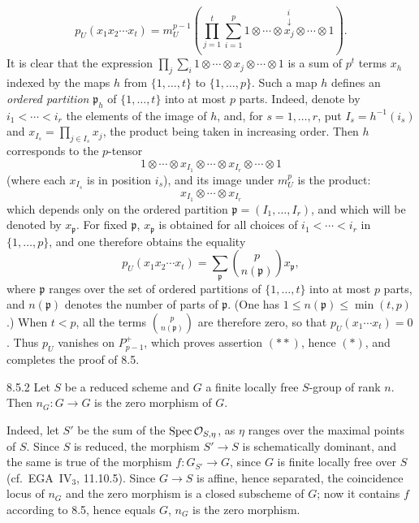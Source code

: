 \[
p_U(x_1x_2\cdots x_t)=m_U^{p-1}\left(\prod_{j=1}^t\sum_{i=1}^p1\otimes\cdots\otimes\overset{\substack{i\\\downarrow}}{x_j}\otimes\cdots\otimes1\right).
\]
It is clear that the expression $\prod_j\sum_i1\otimes\cdots\otimes x_j\otimes\cdots\otimes1$ is a sum of $p^t$ terms $x_h$ indexed by the maps $h$ from $\{1,\ldots,t\}$ to $\{1,\ldots,p\}$. Such a map $h$ defines an \emph{ordered partition} $\mathfrak p_h$ of $\{1,\ldots,t\}$ into at most $p$ parts. Indeed, denote by $i_1<\cdots<i_r$ the elements of the image of $h$, and, for $s=1,\ldots,r$, put $I_s=h^{-1}(i_s)$ and $x_{I_s}=\prod_{j\in I_s}x_j$, the product being taken in increasing order. Then $h$ corresponds to the $p$-tensor
\[
1\otimes\cdots\otimes x_{I_1}\otimes\cdots\otimes x_{I_r}\otimes\cdots\otimes1
\]
(where each $x_{I_s}$ is in position $i_s$), and its image under $m_U^p$ is the product:
\[
x_{I_1}\otimes\cdots\otimes x_{I_r}
\]
which depends only on the ordered partition $\mathfrak p=(I_1,\ldots,I_r)$, and which will be denoted by $x_{\mathfrak p}$. For fixed $\mathfrak p$, $x_{\mathfrak p}$ is obtained for all choices of $i_1<\cdots<i_r$ in $\{1,\ldots,p\}$, and one therefore obtains the equality
\[
p_U(x_1x_2\cdots x_t)=\sum_{\mathfrak p}\binom p{n(\mathfrak p)}x_{\mathfrak p},
\]
where $\mathfrak p$ ranges over the set of ordered partitions of $\{1,\ldots,t\}$ into at most $p$ parts, and $n(\mathfrak p)$ denotes the number of parts of $\mathfrak p$. (One has $1\leq n(\mathfrak p)\leq\min(t,p)$.)
When $t<p$, all the terms $\binom p{n(\mathfrak p)}$ are therefore zero, so that $p_U(x_1\cdots x_t)=0$. Thus $p_U$ vanishes on $P_{p-1}^+$, which proves assertion $(**)$, hence $(*)$, and completes the proof of 8.5.

\begin{corollary}{8.5.2}\label{VIIA.8.5.2}
Let $S$ be a reduced scheme and $G$ a finite locally free $S$-group of rank $n$. Then $n_G:G\to G$ is the zero morphism of $G$.
\end{corollary}
Indeed, let $S'$ be the sum of the $\operatorname{Spec}\mathcal{O}_{S,\eta}$, as $\eta$ ranges over the maximal points of $S$. Since $S$ is reduced, the morphism $S'\to S$ is schematically dominant, and the same is true of the morphism $f:G_{S'}\to G$, since $G$ is finite locally free over $S$ (cf.\ EGA~IV$_3$, 11.10.5). Since $G\to S$ is affine, hence separated, the coincidence locus of $n_G$ and the zero morphism is a closed subscheme of $G$; now it contains $f$ according to 8.5, hence equals $G$, \ie $n_G$ is the zero morphism.


